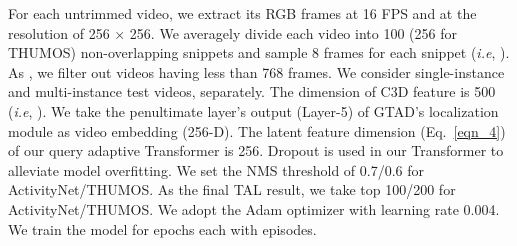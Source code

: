 \documentclass{bmvc2k}
\def\ie{\emph{i.e}\bmvaOneDot}
\begin{document}
\noindent For each untrimmed video, we extract its RGB frames at 16 FPS and at the resolution of 256 × 256. We averagely divide each video into 100 (256 for THUMOS) non-overlapping snippets and sample 8 frames for each snippet (\ie, ). As \cite{yang2020localizing}, we filter out videos having less than 768 frames.
We consider single-instance and multi-instance test videos, separately.
The dimension of C3D feature is 500 (\ie, ). 
We take the penultimate layer's output (Layer-5) of GTAD's localization module as video embedding (256-D).
The latent feature dimension  (Eq.~\eqref{eqn_4}) of our query adaptive Transformer is 256.
Dropout is used in our Transformer to alleviate model overfitting.
We set the NMS threshold of 0.7/0.6 for ActivityNet/THUMOS.
As the final TAL result, we take top 100/200 for ActivityNet/THUMOS. 
We adopt the Adam optimizer \cite{sutskever2013importance} with learning rate 0.004.
We train the model for  epochs each with  episodes.
\end{document}
